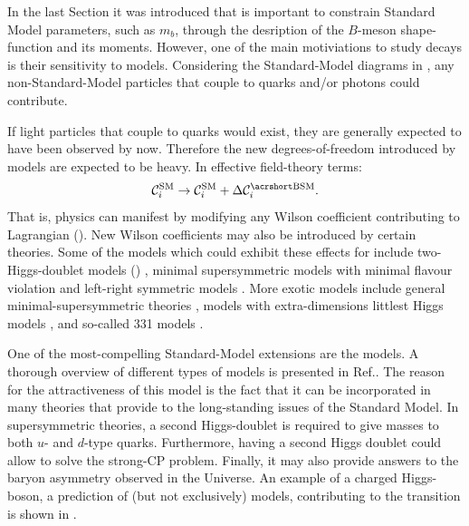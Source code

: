In the last Section it was introduced that \BtoXsgamma is important to constrain Standard Model parameters, such as $m_b$, through the desription of the $B$-meson shape-function and its moments.
However, one of the main motiviations to study \BtoXsgamma decays is their sensitivity to \BSM models.
Considering the Standard-Model diagrams in , any non-Standard-Model particles that couple to quarks and/or photons could contribute.

If light particles that couple to quarks would exist, they are generally expected to have been observed by now.
Therefore the new degrees-of-freedom introduced by \BSM models are expected to be heavy.
In effective field-theory terms:
\begin{equation}\label{eq:corr_wilson}
    \mathcal{C}_i^{\mathrm{SM}} \ra \mathcal{C}_i^{\mathrm{SM}} + \Delta\mathcal{C}_i^{\mathrm{\BSM}}.
\end{equation}
That is, \BSM physics can manifest by modifying any Wilson coefficient contributing to \btosgamma Lagrangian ().
New Wilson coefficients may also be introduced by certain theories.
Some of the models which could exhibit these effects for \BtoXsgamma include 
two-Higgs-doublet models (\TwoHDM) \cite{Borzumati:1998tg,Bobeth:1999ww,Hermann:2012fc}, 
minimal supersymmetric models with minimal flavour violation \cite{Bobeth:1999ww,Borzumati:2003rr,Degrassi:2006eh,Freitas:2007dp}
and left-right symmetric models \cite{Bobeth:1999ww}.
More exotic models include 
general minimal-supersymmetric theories \cite{Ciuchini:2007ha},
models with extra-dimensions \cite{Buras:2003mk,Agashe:2004cp,Haisch:2007vb,Freitas:2008vh}
littlest Higgs models \cite{Buras:2006wk,Blanke:2006sb},
and so-called 331 models \cite{Promberger:2008xg}.

One of the most-compelling Standard-Model extensions are the \TwoHDM models.
A thorough overview of different types of \TwoHDM models is presented in Ref.\cite{Branco:2011iw}.
The reason for the attractiveness of this model is the fact that it can be incorporated in many theories that provide to the long-standing issues of the Standard Model.
In supersymmetric theories, a second Higgs-doublet is required to give masses to both $u$- and $d$-type quarks.
Furthermore, having a second Higgs doublet could allow to solve the strong-CP problem.
Finally, it may also provide answers to the baryon asymmetry observed in the Universe.
An example of a charged Higgs-boson, a prediction of (but not exclusively) \TwoHDM models, contributing to the \btosgamma transition is shown in .

